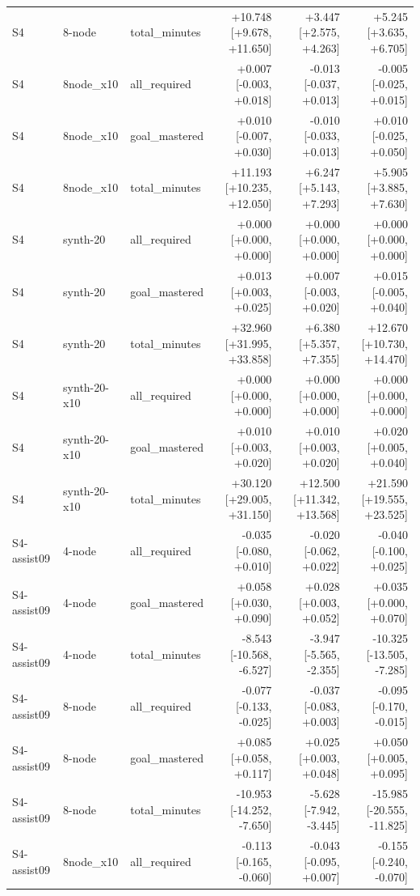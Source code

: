 \begin{table}[htbp]
\begin{tabular}{lllrrr}
S4 & 8-node & total\_minutes & +10.748 [+9.678, +11.650] & +3.447 [+2.575, +4.263] & +5.245 [+3.635, +6.705] \\
S4 & 8node\_x10 & all\_required & +0.007 [-0.003, +0.018] & -0.013 [-0.037, +0.013] & -0.005 [-0.025, +0.015] \\
S4 & 8node\_x10 & goal\_mastered & +0.010 [-0.007, +0.030] & -0.010 [-0.033, +0.013] & +0.010 [-0.025, +0.050] \\
S4 & 8node\_x10 & total\_minutes & +11.193 [+10.235, +12.050] & +6.247 [+5.143, +7.293] & +5.905 [+3.885, +7.630] \\
S4 & synth-20 & all\_required & +0.000 [+0.000, +0.000] & +0.000 [+0.000, +0.000] & +0.000 [+0.000, +0.000] \\
S4 & synth-20 & goal\_mastered & +0.013 [+0.003, +0.025] & +0.007 [-0.003, +0.020] & +0.015 [-0.005, +0.040] \\
S4 & synth-20 & total\_minutes & +32.960 [+31.995, +33.858] & +6.380 [+5.357, +7.355] & +12.670 [+10.730, +14.470] \\
S4 & synth-20-x10 & all\_required & +0.000 [+0.000, +0.000] & +0.000 [+0.000, +0.000] & +0.000 [+0.000, +0.000] \\
S4 & synth-20-x10 & goal\_mastered & +0.010 [+0.003, +0.020] & +0.010 [+0.003, +0.020] & +0.020 [+0.005, +0.040] \\
S4 & synth-20-x10 & total\_minutes & +30.120 [+29.005, +31.150] & +12.500 [+11.342, +13.568] & +21.590 [+19.555, +23.525] \\
S4-assist09 & 4-node & all\_required & -0.035 [-0.080, +0.010] & -0.020 [-0.062, +0.022] & -0.040 [-0.100, +0.025] \\
S4-assist09 & 4-node & goal\_mastered & +0.058 [+0.030, +0.090] & +0.028 [+0.003, +0.052] & +0.035 [+0.000, +0.070] \\
S4-assist09 & 4-node & total\_minutes & -8.543 [-10.568, -6.527] & -3.947 [-5.565, -2.355] & -10.325 [-13.505, -7.285] \\
S4-assist09 & 8-node & all\_required & -0.077 [-0.133, -0.025] & -0.037 [-0.083, +0.003] & -0.095 [-0.170, -0.015] \\
S4-assist09 & 8-node & goal\_mastered & +0.085 [+0.058, +0.117] & +0.025 [+0.003, +0.048] & +0.050 [+0.005, +0.095] \\
S4-assist09 & 8-node & total\_minutes & -10.953 [-14.252, -7.650] & -5.628 [-7.942, -3.445] & -15.985 [-20.555, -11.825] \\
S4-assist09 & 8node\_x10 & all\_required & -0.113 [-0.165, -0.060] & -0.043 [-0.095, +0.007] & -0.155 [-0.240, -0.070] \\

\end{tabular}
\end{table}
